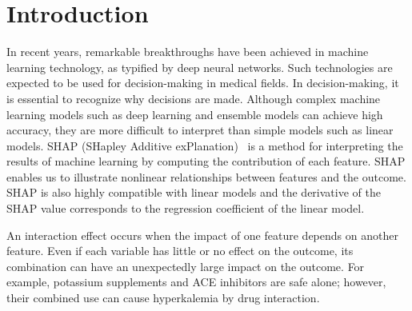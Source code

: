 \documentclass[nohyperref]{article}
\theoremstyle{plain}
\theoremstyle{definition}
\theoremstyle{remark}
\begin{document}
\begin{abstract}
When using machine learning techniques in decision-making processes, the interpretability of the models is important. Shapley additive explanation (SHAP) is one of the most promising interpretation methods for machine learning models. Interaction effects occur when the effect of one variable depends on the value of another variable. Even if each variable has little effect on the outcome, its combination can have an unexpectedly large impact on the outcome. Understanding interactions is important for understanding machine learning models; however, naive SHAP analysis cannot distinguish between the main effect and interaction effects. In this paper, we introduce the Shapley-Taylor index as an interpretation method for machine learning models using SHAP considering interaction effects. We apply the method to the cancer cohort data of Kyushu University Hospital (N=29,080) to analyze what combination of factors contributes to the risk of colon cancer.
\end{abstract}



\section{Introduction}
In recent years, remarkable breakthroughs have been achieved in machine learning technology, as typified by deep neural networks. Such technologies are expected to be used for decision-making in medical fields. In decision-making, it is essential to recognize why decisions are made. Although complex machine learning models such as deep learning and ensemble models can achieve high accuracy, they are more difficult to interpret than simple models such as linear models.
SHAP (SHapley Additive exPlanation)~\cite{lundberg2017unified} is a method for interpreting the results of machine learning by computing the contribution of each feature.
SHAP enables us to illustrate nonlinear relationships between features and the outcome.
SHAP is also highly compatible with linear models and the derivative of the SHAP value corresponds to the regression coefficient of the linear model.

An interaction effect occurs when the impact of one feature depends on another feature.
Even if each variable has little or no effect on the outcome, its combination can have an unexpectedly large impact on the outcome.
For example, potassium supplements and ACE inhibitors are safe alone; however, their combined use can cause hyperkalemia by drug interaction.
\end{document}
